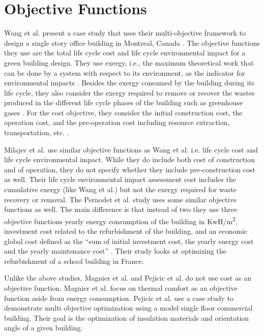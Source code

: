 \section{Objective Functions}\label{sec:functions}

Wang et al. present a case study that uses their multi-objective framework to design a single story office building in Montreal, Canada \cite{Wang2005b}. The objective functions they use are the total life cycle cost and life cycle environmental impact for a green building design. They use exergy, i.e., the maximum theoretical work that can be done by a system with respect to its environment, as the indicator for environmental impacts \cite{Wang2005b}. Besides the exergy consumed by the building during its life cycle, they also consider the exergy required to remove or recover the wastes produced in the different life cycle phases of the building such as greenhouse gases \cite{Wang2005b}. For the cost objective, they consider the initial construction cost, the operation cost, and the pre-operation cost including resource extraction, transportation, etc. \cite{Wang2005b}. 

Milajec et al. use similar objective functions as Wang et al. i.e. life cycle cost and life cycle environmental impact. While they do include both cost of construction and of operation, they do not specify whether they include pre-construction cost as well. Their life cycle environmental impact assessment cost includes the cumulative exergy (like Wang et al.) but not the exergy required for waste recovery or removal. The Pernodet et al. study uses some similar objective functions as well. The main difference is that instead of two they use three objective functions \textemdash yearly energy consumption of the building in KwH/m\textsuperscript{2}, investment cost related to the refurbishment of the building, and an economic global cost defined as the ``sum of initial investment cost, the yearly energy cost and the yearly maintenance cost'' \cite{Pernodet2009}. Their study looks at optimizing the refurbishment of a school building in France.

Unlike the above studies, Magnier et al. and Pejicic et al. do not use cost as an objective function. Magnier et al. focus on thermal comfort as an objective function aside from energy consumption. Pejicic et al. use a case study to demonstrate multi objective optimization using a model single floor commercial building. Their goal is the optimization of insulation materials and orientation angle of a given building. 


